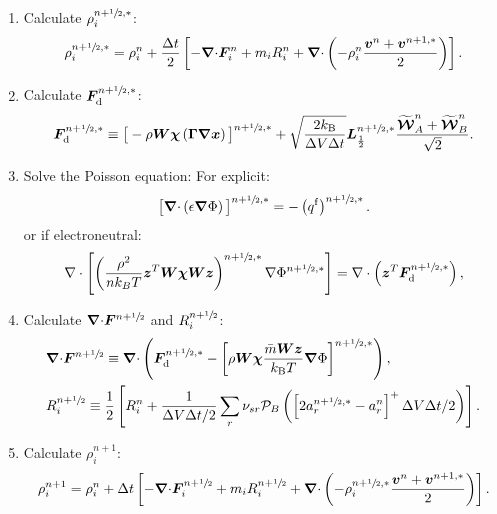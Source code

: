 \documentclass[
10pt
showpacs, showkeys,
amsmath,amssymb,
aps,
pre,
floatfix,
]{revtex4-1}
\newcommand{\divg}{{\V\nabla\cdot}}                       %
\begin{document}
\begin{enumerate}
\item Calculate $\rho^{n+\sfrac{1}{2},*}_i$:
\begin{equation}
\rho^{n+\myhalf,*}_i = \rho^n_i + \frac{\D{t}}{2} \left[ -\divg\V{F}^n_i + m_i R^n_i + \divg\left( -\rho^n_i \frac{\V{v}^n+\V{v}^{n+1,*}}{2} \right) \right].
\end{equation}

\item Calculate $\boldsymbol{F}_\mathrm{d}^{n+\sfrac{1}{2},*}$:
\begin{equation}
\boldsymbol{F}_\mathrm{d}^{n+\sfrac{1}{2},*} \equiv \big[-\rho\boldsymbol{W}\boldsymbol{\chi}\left(\boldsymbol{\Gamma}\boldsymbol{\nabla}\boldsymbol{x}\right)\big]^{n+\sfrac{1}{2},*} +
\sqrt{ \frac{2k_\mathrm{B}}{\Delta V\Delta t} } \boldsymbol{L}^{n+\sfrac{1}{2},*}_{\frac12} \frac{\widetilde{\boldsymbol{\mathcal{W}}}_A^n+\widetilde{\boldsymbol{\mathcal{W}}}_B^n}{\sqrt{2}}.
\end{equation}

\item Solve the Poisson equation:
For explicit:
\begin{equation}
\big[\divg\left(\epsilon\grad\Phi\right)\big]^{n+\myhalf,*} = - \left(q^\mathrm{f}\right)^{n+\myhalf,*}.
\end{equation}
or if electroneutral:
\begin{equation}
 \nabla \cdot \left[ \left(\frac{\rho^2}{n k_B T} \boldsymbol{z}^T \boldsymbol{W} \boldsymbol{\chi} \boldsymbol{W} \boldsymbol{z}\right)^{n+\sfrac{1}{2},*} \nabla \Phi^{n+\sfrac{1}{2},*} \right] = 
 \nabla \cdot \left( \boldsymbol{z}^T \boldsymbol{F}_\mathrm{d}^{n+\sfrac{1}{2},*} \right),
\end{equation}

\item Calculate $\divg\V{F}^{n+\myhalf}$ and $R^{n+\sfrac{1}{2}}_i$:
\begin{align}
&\divg\V{F}^{n+\myhalf} \equiv \divg\left(\V{F}_\mathrm{d}^{n+\myhalf,*} - \left[\rho\V{W}\V{\chi}\frac{\bar{m}\M{W}\V{z}}{k_\mathrm{B}T}\grad\Phi\right]^{n+\myhalf,*}\right),
\\
&R^{n+\myhalf}_i \equiv \frac{1}{2}\left[ R_i^n + \frac{1}{\D{V}\D{t}/2} \sum_r \nu_{sr} \mathcal{P}_B\left( \left[ 2 a^{n+\myhalf,*}_r - a^n_r \right]^+ \D{V}\D{t}/2 \right) \right].
\end{align}

\item Calculate $\rho^{n+1}_i$:
\begin{equation}
\rho^{n+1}_i = \rho^n_i + \D{t} \left[ -\divg\V{F}^{n+\myhalf}_i + m_i R^{n+\myhalf}_i 
+ \divg\left( -\rho^{n+\myhalf,*}_i \frac{\V{v}^n + \V{v}^{n+1,*}}{2} \right) \right].
\end{equation} 


\end{enumerate}
\end{document}
